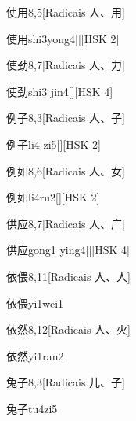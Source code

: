 \begin{entry}{使用}{8,5}[Radicais ⼈、⽤]
  \begin{phonetics}{使用}{shi3yong4}[][HSK 2]
  \end{phonetics}
\end{entry}

\begin{entry}{使劲}{8,7}[Radicais ⼈、⼒]
  \begin{phonetics}{使劲}{shi3 jin4}[][HSK 4]
  \end{phonetics}
\end{entry}

\begin{entry}{例子}{8,3}[Radicais ⼈、⼦]
  \begin{phonetics}{例子}{li4 zi5}[][HSK 2]
  \end{phonetics}
\end{entry}

\begin{entry}{例如}{8,6}[Radicais ⼈、⼥]
  \begin{phonetics}{例如}{li4ru2}[][HSK 2]
  \end{phonetics}
\end{entry}

\begin{entry}{供应}{8,7}[Radicais ⼈、⼴]
  \begin{phonetics}{供应}{gong1 ying4}[][HSK 4]
  \end{phonetics}
\end{entry}

\begin{entry}{依偎}{8,11}[Radicais ⼈、⼈]
  \begin{phonetics}{依偎}{yi1wei1}
  \end{phonetics}
\end{entry}

\begin{entry}{依然}{8,12}[Radicais ⼈、⽕]
  \begin{phonetics}{依然}{yi1ran2}
  \end{phonetics}
\end{entry}

\begin{entry}{兔子}{8,3}[Radicais ⼉、⼦]
  \begin{phonetics}{兔子}{tu4zi5}
  \end{phonetics}
\end{entry}

